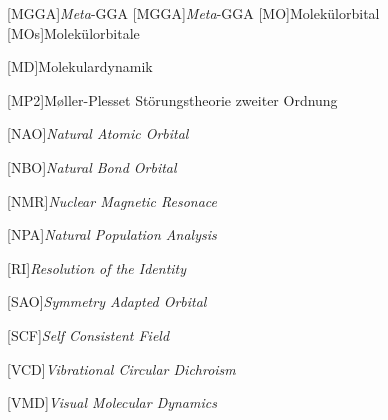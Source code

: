 \begin{acronym}[SEPSEP]
	[MGGA]{\textit{Meta}-GGA}   
		{\textit{Meta}-GGA}	
	[MO]{Molekülorbital}   
		[MOs]{Molekülorbitale}
		
	[MD]{Molekulardynamik}
	
	[MP2]{M\o ller-Plesset Störungstheorie zweiter Ordnung}
		
    [NAO]{\textit{Natural Atomic Orbital}}

    [NBO]{\textit{Natural Bond Orbital}}
    
    [NMR]{\textit{Nuclear Magnetic Resonace}}
        
    [NPA]{\textit{Natural Population Analysis}}
      
    [RI]{\textit{Resolution of the Identity}}
    
    [SAO]{\textit{Symmetry Adapted Orbital}}
    
	[SCF]{\textit{Self Consistent Field}}   
		
	[VCD]{\textit{Vibrational Circular Dichroism}}
     
    [VMD]{\textit{Visual Molecular Dynamics}}
\end{acronym}